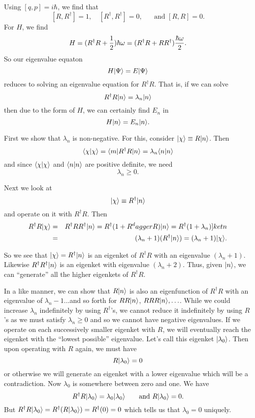 Using $[q,p] = i\hbar$, we find that 
$$[R,R^\dagger] = 1, \quad [R^\dagger, R^\dagger] = 0, \mbox{~~~~~and } [R,R] = 0.$$
For $H$, we find 
$$H = (R^\dagger R + {1\over2})\hbar\omega = (R^\dagger R + RR^\dagger){\hbar\omega\over2}.$$
So our eigenvalue equaton
$$H|\Psi\rangle = E|\Psi\rangle$$ reduces to solving an eigenvalue equation for
$R^\dagger R$. That is, if we can solve 
$$R^\dagger R |n\rangle = \lambda_n |n\rangle$$ then due to the form of $H$, we can certainly find $E_n$ in 
$$H|n\rangle = E_n |n\rangle.$$ 

First we show that $\lambda_n$ is non-negative. For this, consider $|\chi\rangle \equiv R|n\rangle$. Then 
$$\langle \chi|\chi\rangle = \langle m| R ^\dagger R| n \rangle  = \lambda_n\langle n|n\rangle$$ and since $\langle \chi|\chi\rangle$ and $\langle n|n\rangle$ are positive definite, we need
$$\lambda_n \ge 0.$$

Next we look at
$$|\chi\rangle \equiv R^\dagger |n\rangle$$ and operate on it with $R^\dagger R$. Then
\begin{eqnarray*}
R^\dagger R|\chi\rangle &=& R^\dagger R R^\dagger|n\rangle = R^\dagger(1+ R^dagger R)|n\rangle = R^\dagger(1+\lambda_n)]ket{n}\\
                                    &=& (\lambda_n + 1)(R^\dagger|n\rangle) = (\lambda_n + 1) |\chi\rangle.
\end{eqnarray*}

So we see that $|\chi\rangle = R^\dagger |n\rangle$ is an eigenket of $R^\dagger R$ with an eigenvalue $(\lambda_n + 1)$. Likewise $R^\dagger R^\dagger |n\rangle$ is an eigenket with 
eigenvalue $(\lambda_n+2)$. Thus, given $|n\rangle$, we can ``generate'' all the higher eigenkets of $R^\dagger R$.

In a like manner, we can show that $R|n\rangle$ is also an eigenfunction of $R^\dagger R$ with an eigenvalue of $\lambda_n-1$...and so forth for $RR|n\rangle$, $RRR|n\rangle, \hdots$. 
While we could increase $\lambda_n$ indefinitely by using $R^\dagger$'s, we cannot reduce it indefinitely by using $R$'s as we must satisfy $\lambda_n \ge 0$ and so we cannot have
negative eigenvalues. If we operate on each successively smaller eigenket with $R$, we will eventually reach the eigenket with the ``lowest possible'' eigenvalue. 
Let's call this eigenket $|\lambda_0\rangle$. Then upon operating with $R$ again, we must have
$$R|\lambda_0\rangle = 0$$ or otherwise we will generate an eigenket with a lower eigenvalue which will be a contradiction. Now $\lambda_0$ is somewhere between zero and one. We have
$$R^\dagger R|\lambda_0\rangle = \lambda_0|\lambda_0\rangle \mbox{~~~~~ and } R|\lambda_0\rangle = 0.$$
But $R^\dagger R|\lambda_0\rangle = R^\dagger (R|\lambda_0\rangle) = R^\dagger (0) = 0$ which tells us that $\lambda_0 = 0$ uniquely.







